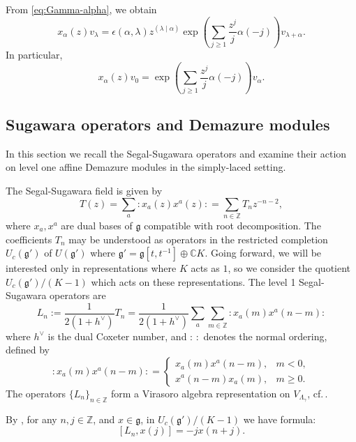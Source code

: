 \documentclass[a4paper, 12pt]{amsart}
\theoremstyle{definition}
\newcommand{\g}{\mathfrak g}
\begin{document}
From \eqref{eq:Gamma-alpha}, we obtain
\begin{equation} \label{eq:VOA-extrem-vec}
x_\alpha(z) v_\lambda=   \epsilon(\alpha,\lambda) z^{(\lambda\mid \alpha)}    \exp\!\left(\sum_{j\ge1}\frac{z^j}{j}\alpha(-j)\right) v_{\lambda+\alpha} . \end{equation}
In particular, 
\begin{equation} \label{eq:VOA-vec-0}
x_\alpha(z) v_0=   \exp\!\left(\sum_{j\ge1}\frac{z^j}{j}\alpha(-j)\right) v_{\alpha} . \end{equation}


\subsection{Sugawara operators and Demazure modules}
\label{subsec:sugawara-FK}
In this section we recall the Segal-Sugawara operators and examine their action on level one affine Demazure modules in the simply-laced setting.

The Segal-Sugawara field is given by
\begin{equation}
T(z)=\sum_a :x_a(z)x^a(z): =\sum_{n\in\mathbb Z}T_nz^{-n-2},
\end{equation}
where $x_a,x^a$ are dual bases of $\mathfrak g$ compatible with root decomposition.  The coefficients $T_n$ may be understood as operators in the restricted completion $U_{c}(\mathfrak{g}')$ of $U( \mathfrak{g}')$ where $\mathfrak{g}'=\mathfrak{g}[t,t^{-1}] \oplus \mathbb{C}K$. 
Going forward, we will be interested only in representations where $K$ acts as $1$, so we consider the quotient $U_c(\mathfrak{g}')/(K-1)$ which acts on these representations.  The level 1 Segal-Sugawara operators are
\begin{equation}\label{eq:sug}
L_n:=\frac{1}{2(1+h^{\vee})}T_n=\frac{1}{2(1+h^{\vee})} \sum_a \sum_{m \in \mathbb{Z}} :x_a(m)x^a(n-m): \end{equation}
where $h^\vee$ is the dual Coxeter number, and $: \,:$ denotes the normal ordering, defined by
\[
:x_a(m)x^a(n-m):
=
\begin{cases}
x_a(m)x^a(n-m), & m<0,\\[2mm]
x^a(n-m)x_a(m), & m\geq0.
\end{cases}
\]
 The operators $\{L_n\}_{n\in \mathbb{Z}}$ form a Virasoro algebra representation on $V_{\Lambda_\gamma}$, cf.\,\cite[Corollary 12.8]{Kac}.

By \cite[Lemma 12.8]{Kac},  
for any $n, j\in \mathbb{Z}$, and $x\in \g$,  in $U_c(\mathfrak{g}')/(K-1)$ we have formula:
\begin{equation}\label{eq:sug-com}
 [L_n, x(j)]= -jx(n+j).\end{equation}
\end{document}
